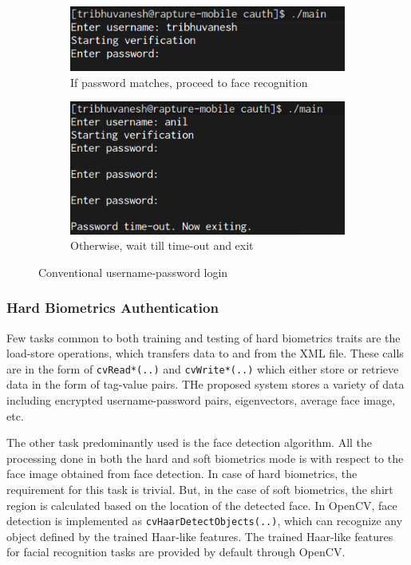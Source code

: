\documentclass[12pt]{article}			%
\begin{document}
\begin{figure}[b]
        \begin{subfigure}[b]{0.6\textwidth}
                \centering
                \includegraphics[scale=0.4]{img/login.png}
                \caption{If password matches, proceed to face recognition}
                \label{fig:pwd1}
        \end{subfigure}%
        \begin{subfigure}[b]{0.5\textwidth}
                \centering
                \includegraphics[scale=0.35]{img/login2.png}
                \caption{Otherwise, wait till time-out and exit}
                \label{fig:pwd2}
        \end{subfigure}
        \caption{Conventional username-password login}\label{fig:pwd}
\end{figure}

\subsubsection{ Hard Biometrics Authentication }

Few tasks common to both training and testing of hard biometrics traits are the load-store operations, which transfers data to and from the XML file.
These calls are in the form of \verb+cvRead*(..)+ and \verb+cvWrite*(..)+ which either store or retrieve data in the form of tag-value pairs.
THe proposed system stores a variety of data including encrypted username-password pairs, eigenvectors, average face image, etc. 

The other task predominantly used is the face detection algorithm.
All the processing done in both the hard and soft biometrics mode is with respect to the face image obtained from face detection.
In case of hard biometrics, the requirement for this task is trivial.
But, in the case of soft biometrics, the shirt region is calculated based on the location of the detected face.
In OpenCV, face detection is implemented as \verb+cvHaarDetectObjects(..)+, which can recognize any object defined by the trained Haar-like features.
The trained Haar-like features for facial recognition tasks are provided by default through OpenCV.
\end{document}
